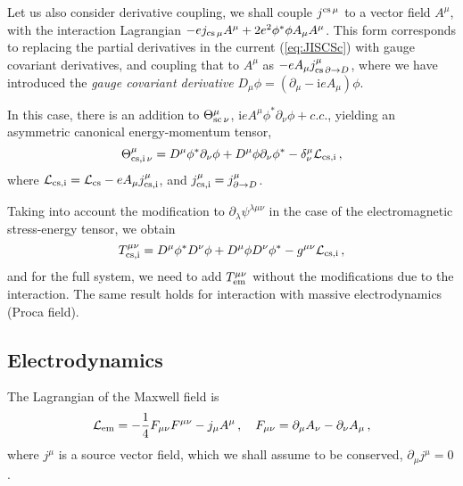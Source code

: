 \documentclass[a4paper,12pt]{article}
\def\imagi{\mathrm{i}}
\def\lag{{\mathcal{L}}}
\begin{document}
Let us also consider derivative coupling, we shall couple $j^{{\rm cs}\,\mu}$ to a vector field $A^\mu$, with the interaction Lagrangian $-ej_{{\rm cs}\,\mu}A^\mu+2e^2\phi^*\phi A_\mu A^\mu$. This form corresponds to replacing the partial derivatives in the current (\ref{eq:JISCSc}) with gauge covariant derivatives, and coupling that to $A^\mu$ as $-e A_\mu j^\mu_{{\rm cs}\,\partial \to D}$, where we have introduced the \emph{gauge covariant derivative} $D_\mu \phi = (\partial_\mu-\imagi e A_\mu)\phi$.

In this case, there is an addition to $\Theta^\mu_{{\rm sc}\,\nu}$, $\imagi e A^\mu \phi^*\partial_\nu \phi + c.c.$, yielding an asymmetric canonical energy-momentum tensor,
\begin{equation}\label{eq:EMcanCScE}
 \Theta^\mu_{{\rm cs,i}\,\nu} = D^\mu\phi^*\partial_\nu\phi + D^\mu\phi\partial_\nu\phi^* -\delta^\mu_\nu \lag_{\rm cs,i}\,,
\end{equation}
where $\lag_{\rm cs,i} = \lag_{\rm cs}-e A_\mu j^\mu_{\rm cs,i}$, and $j^\mu_{\rm cs,i}=j^\mu_{\partial \to D}$.

Taking into account the modification to $\partial_\lambda \psi^{\lambda\mu\nu}$ in the case of the electromagnetic stress-energy tensor, we obtain
\begin{equation}\label{eq:SymmCSci}
 T^{\mu\nu}_{\rm cs,i} = D^\mu\phi^* D^\nu\phi + D^\mu\phi D^\nu\phi^* - g^{\mu\nu}\lag_{\rm cs,i}\,,
\end{equation}
and for the full system, we need to add $T^{\mu\nu}_{\rm em}$ without the modifications due to the interaction. The same result holds for interaction with massive electrodynamics (Proca field).





\subsection{Electrodynamics}\label{ssec:eldyn}
The Lagrangian of the Maxwell field is
\begin{equation}\label{eq:LagM}
 \lag_{\rm em} = -\frac{1}{4}F_{\mu\nu}F^{\mu\nu} -j_\mu A^\mu\,,\quad F_{\mu\nu}=\partial_\mu A_\nu - \partial_\nu A_\mu\,,
\end{equation}
where $j^\mu$ is a source vector field, which we shall assume to be conserved, $\partial_\mu j^\mu =0$.
\end{document}
